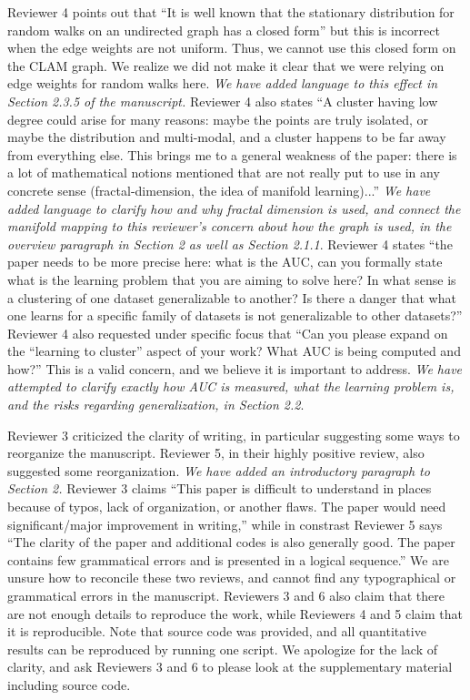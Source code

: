 \documentclass{article}
\begin{document}
Reviewer 4 points out that ``It is well known that the stationary distribution for random walks on an undirected graph has a closed form'' but this is incorrect when the edge weights are not uniform.
Thus, we cannot use this closed form on the CLAM graph.
We realize we did not make it clear that we were relying on edge weights for random walks here.
\emph{We have added language to this effect in Section 2.3.5 of the manuscript.}
Reviewer 4 also states ``A cluster having low degree could arise for many reasons: maybe the points are truly isolated, or maybe the distribution and multi-modal, and a cluster happens to be far away from everything else. 
This brings me to a general weakness of the paper: there is a lot of mathematical notions mentioned that are not really put to use in any concrete sense (fractal-dimension, the idea of manifold learning)...''
\emph{We have added language to clarify how and why fractal dimension is used, and connect the manifold mapping to this reviewer's concern about how the graph is used, in the overview paragraph in Section 2 as well as Section 2.1.1}.
Reviewer 4 states ``the paper needs to be more precise here: what is the AUC, can you formally state what is the learning problem that you are aiming to solve here? In what sense is a clustering of one dataset generalizable to another? Is there a danger that what one learns for a specific family of datasets is not generalizable to other datasets?''
Reviewer 4 also requested under specific focus that ``Can you please expand on the ``learning to cluster'' aspect of your work? What AUC is being computed and how?''
This is a valid concern, and we believe it is important to address.
\emph{We have attempted to clarify exactly how AUC is measured, what the learning problem is, and the risks regarding generalization, in Section 2.2}.

Reviewer 3 criticized the clarity of writing, in particular suggesting some ways to reorganize the manuscript.
Reviewer 5, in their highly positive review, also suggested some reorganization.
\emph{We have added an introductory paragraph to Section 2.}
Reviewer 3 claims ``This paper is difficult to understand in places because of typos, lack of organization, or another flaws. The paper would need significant/major improvement in writing,'' while in constrast Reviewer 5 says ``The clarity of the paper and additional codes is also generally good. The paper contains few grammatical errors and is presented in a logical sequence.''
We are unsure how to reconcile these two reviews, and cannot find any typographical or grammatical errors in the manuscript.
Reviewers 3 and 6 also claim that there are not enough details to reproduce the work, while Reviewers 4 and 5 claim that it is reproducible.
Note that source code was provided, and all quantitative results can be reproduced by running one script.
We apologize for the lack of clarity, and ask Reviewers 3 and 6 to please look at the supplementary material including source code.
\end{document}
